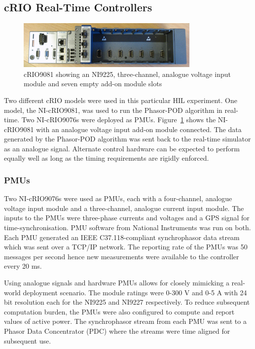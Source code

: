 \documentclass[a4paper, 10 pt, conference]{IEEEtran}
\begin{document}
\subsection{cRIO Real-Time Controllers}
\begin{figure}[H]
\centering
\includegraphics[width=3.5in]{DSC05446.JPG}
\vspace{-0.5em}
\caption{cRIO9081 showing an NI9225, three-channel, analogue voltage input module and seven empty add-on module slots}
\label{cRIO}
\end{figure}
Two different cRIO models were used in this particular HIL experiment. One model, the NI-cRIO9081, was used to run the Phasor-POD algorithm in real-time. Two NI-cRIO9076s were deployed as PMUs. Figure~\ref{cRIO} shows the NI-cRIO9081 with an analogue voltage input add-on module connected. The data generated by the Phasor-POD algorithm was sent back to the real-time simulator as an analogue signal. Alternate control hardware can be expected to perform equally well as long as the timing requirements are rigidly enforced.

\subsubsection*{PMUs} Two NI-cRIO9076s were used as PMUs, each with a four-channel, analogue voltage input module and a three-channel, analogue current input module. The inputs to the PMUs were three-phase currents and voltages and a GPS signal for time-synchronisation. PMU software from National Instruments was run on both. Each PMU generated an IEEE C37.118-compliant synchrophasor data stream which was sent over a TCP/IP network. The reporting rate of the PMUs was 50 messages per second hence new measurements were available to the controller every 20 ms. 

Using analogue signals and hardware PMUs allows for closely mimicking a real-world deployment scenario. The module ratings were 0-300 V and 0-5 A with 24 bit resolution each\cite{cRIO9081} for the NI9225 and NI9227 respectively. To reduce subsequent computation burden, the PMUs were also configured to compute and report values of active power. The synchrophasor stream from each PMU was sent to a Phasor Data Concentrator (PDC)\cite{SEL} where the streams were time aligned for subsequent use.
\end{document}
